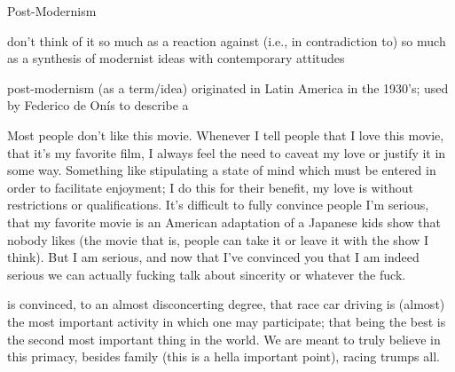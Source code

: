 \documentclass[../butidigress.tex]{subfiles}
\begin{document}
\begin{somenotes}{Post-Modernism}
    \item don't think of it so much as a reaction against (i.e., in contradiction to) so much as a synthesis of modernist ideas with contemporary attitudes
    \item post-modernism (as a term/idea) originated in Latin America in the 1930's; used by Federico de Onís to describe a \autocite[4]{originspostmodernity}
\end{somenotes}




Most people don't like this movie.
Whenever I tell people that I love this movie, that it's my favorite film, I always feel the need to caveat my love or justify it in some way.
Something like stipulating a state of mind which must be entered in order to facilitate enjoyment; I do this for their benefit, my love is without restrictions or qualifications.
It's difficult to fully convince people I'm serious, that my favorite movie is an American adaptation of a Japanese kids show that nobody likes (the movie that is, people can take it or leave it with the show I think).
But I am serious, and now that I've convinced you that I am indeed serious we can actually fucking talk about sincerity or whatever the fuck.

 is convinced, to an almost disconcerting degree, that race car driving is (almost) the most important activity in which one may participate; that being the best is the second most important thing in the world.
We are meant to truly believe in this primacy, besides family (this is a hella important point), racing trumps all.
\end{document}
